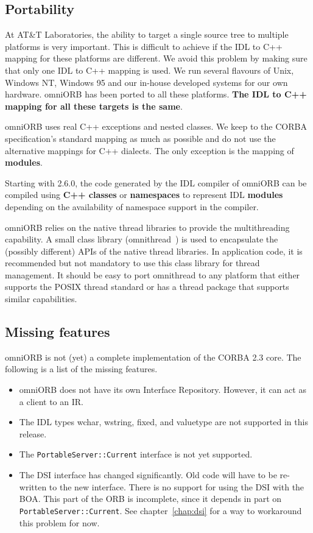 \documentclass[11pt,twoside,a4paper]{book}
\newcommand{\type}[1]{\texttt{#1}}
\begin{document}
\subsection{Portability}

At AT\&T Laboratories, the ability to target a single source tree to
multiple platforms is very important. This is difficult to achieve if
the IDL to C++ mapping for these platforms are different. We avoid
this problem by making sure that only one IDL to C++ mapping is used.
We run several flavours of Unix, Windows NT, Windows 95 and our
in-house developed systems for our own hardware. omniORB has been
ported to all these platforms. \textbf{The IDL to C++ mapping for
all these targets is the same}.

omniORB uses real C++ exceptions and nested classes. We keep to the
CORBA specification's standard mapping as much as possible and do not
use the alternative mappings for C++ dialects. The only exception is
the mapping of \textbf{modules}.

Starting with 2.6.0, the code generated by the IDL compiler of omniORB
can be compiled using \textbf{C++ classes} or \textbf{namespaces} to
represent IDL \textbf{modules} depending on the availability of
namespace support in the compiler.

omniORB relies on the native thread libraries to provide the
multithreading capability. A small class library
(omnithread~\cite{tjr96a}) is used to encapsulate the (possibly
different) APIs of the native thread libraries. In application code,
it is recommended but not mandatory to use this class library for
thread management. It should be easy to port omnithread to any
platform that either supports the POSIX thread standard or has a
thread package that supports similar capabilities.

\subsection{Missing features}
\label{missing}

omniORB is not (yet) a complete implementation of the CORBA 2.3 core.
The following is a list of the missing features.

\begin{itemize}

\item omniORB does not have its own Interface Repository. However, it
can act as a client to an IR.

\item The IDL types wchar, wstring, fixed, and valuetype are not
supported in this release.

\item The \type{PortableServer::Current} interface is not yet
supported.

\item The DSI interface has changed significantly.  Old code will have
to be re-written to the new interface.  There is no support for using
the DSI with the BOA.  This part of the ORB is incomplete, since it
depends in part on \type{PortableServer::Current}.  See
chapter~\ref{chap:dsi} for a way to workaround this problem for now.

\end{itemize}
\end{document}
